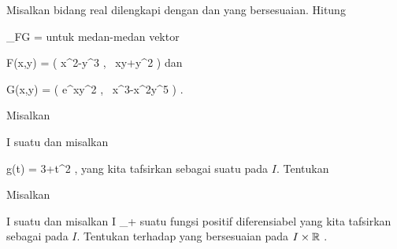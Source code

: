 \setcounter{section}{26}


{}
{

Misalkan bidang real dilengkapi dengan
dan
yang bersesuaian. Hitung

\mavergleichskette
{\vergleichskette
{ \nabla_FG
}
{ = }{
}
{  }{
}
{    }{
}
{   }{
}
}
{}{}{}
untuk medan-medan vektor

\mavergleichskettedisp
{\vergleichskette
{ F(x,y)
}
{ =} { \left(  x^2-y^3  , \,   xy+y^2                   \right)
}
{ } {
}
{ } {
}
{ } {
}
}
{}{}{}
dan

\mavergleichskettedisp
{\vergleichskette
{ G(x,y)
}
{ =} { \left( e^{xy^2}   , \,   x^3-x^2y^5                   \right)
}
{ } {
}
{ } {
}
{ } {
}
}
{}{}{.}

}
{} {}

{}
{

Misalkan

\mavergleichskette
{\vergleichskette
{ I
}
{ \subseteq }{ \R
}
{  }{
}
{    }{
}
{   }{
}
}
{}{}{}
suatu
dan misalkan

\mavergleichskettedisp
{\vergleichskette
{ g(t)
}
{ =} { 3+t^2
}
{ } {
}
{ } {
}
{ } {
}
}
{}{}{,}
yang kita tafsirkan sebagai suatu
pada $I$. Tentukan
 {} {}


}
{} {}

{}
{

Misalkan

\mavergleichskette
{\vergleichskette
{ I
}
{ \subseteq }{ \R
}
{  }{
}
{    }{
}
{   }{
}
}
{}{}{}
suatu
dan misalkan
 { I } {\R_+
} {}
suatu fungsi positif diferensiabel yang kita tafsirkan sebagai
pada $I$. Tentukan
terhadap
yang bersesuaian pada $I \times {\mathbb R}$
 {} {.}

}
{} {}

